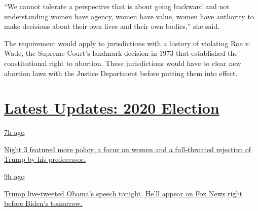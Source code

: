 ``We cannot tolerate a perspective that is about going backward and not
understanding women have agency, women have value, women have authority
to make decisions about their own lives and their own bodies,'' she
said.

The requirement would apply to jurisdictions with a history of violating
Roe v. Wade, the Supreme Court's landmark decision in 1973 that
established the constitutional right to abortion. These jurisdictions
would have to clear new abortion laws with the Justice Department before
putting them into effect.

\hypertarget{latest-updates-2020-election}{%
\section{\texorpdfstring{\href{https://www.nytimes3xbfgragh.onion/live/2020/08/19/us/dnc-convention-election?action=click\&pgtype=Article\&state=default\&region=MAIN_CONTENT_1\&context=storylines_live_updates}{Latest
Updates: 2020
Election}}{Latest Updates: 2020 Election}}\label{latest-updates-2020-election}}

\href{https://www.nytimes3xbfgragh.onion/live/2020/08/19/us/dnc-convention-election?action=click\&pgtype=Article\&state=default\&region=MAIN_CONTENT_1\&context=storylines_live_updates\#night-3-featured-more-policy-a-focus-on-women-and-a-full-throated-rejection-of-trump-by-his-predecessor}{7h
ago}

\href{https://www.nytimes3xbfgragh.onion/live/2020/08/19/us/dnc-convention-election?action=click\&pgtype=Article\&state=default\&region=MAIN_CONTENT_1\&context=storylines_live_updates\#night-3-featured-more-policy-a-focus-on-women-and-a-full-throated-rejection-of-trump-by-his-predecessor}{Night
3 featured more policy, a focus on women and a full-throated rejection
of Trump by his predecessor.}

\href{https://www.nytimes3xbfgragh.onion/live/2020/08/19/us/dnc-convention-election?action=click\&pgtype=Article\&state=default\&region=MAIN_CONTENT_1\&context=storylines_live_updates\#trump-live-tweeted-obamas-speech-tonight-hell-appear-on-fox-news-right-before-bidens-tomorrow}{9h
ago}

\href{https://www.nytimes3xbfgragh.onion/live/2020/08/19/us/dnc-convention-election?action=click\&pgtype=Article\&state=default\&region=MAIN_CONTENT_1\&context=storylines_live_updates\#trump-live-tweeted-obamas-speech-tonight-hell-appear-on-fox-news-right-before-bidens-tomorrow}{Trump
live-tweeted Obama's speech tonight. He'll appear on Fox News right
before Biden's tomorrow.}


